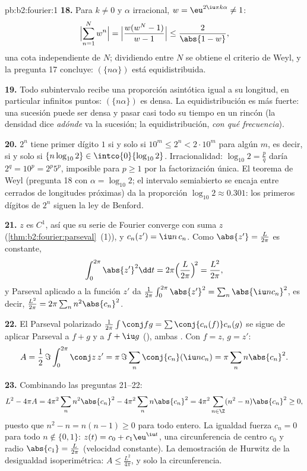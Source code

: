 \begin{solution}{pb:b2:fourier:1}
\textbf{18.} Para $k \neq 0$ y $\alpha$ irracional, $w =
\eu^{2\iu\pi k\alpha} \neq 1$:
\[
\Bigl|\sum_{n=1}^{N}w^n\Bigr|
= \Bigl|\frac{w(w^N - 1)}{w - 1}\Bigr|
\leq \frac{2}{\abs{1 - w}} ,
\]
una cota independiente de $N$; dividiendo entre $N$ se obtiene el
criterio de Weyl, y la pregunta 17 concluye: $(\{n\alpha\})$ está
equidistribuida.

\textbf{19.} Todo subintervalo recibe una proporción asintótica igual
a su longitud, en particular infinitos puntos: $(\{n\alpha\})$ es
densa. La equidistribución es más fuerte: una sucesión puede ser
densa y pasar casi todo su tiempo en un rincón (la densidad dice
\emph{adónde} va la sucesión; la equidistribución, \emph{con qué
frecuencia}).

\textbf{20.} $2^n$ tiene primer dígito $1$ si y solo si $10^m \leq
2^n < 2\cdot10^m$ para algún $m$, es decir, si y solo si
$\{n\log_{10}2\} \in \intco{0}{\log_{10}2}$. Irracionalidad:
$\log_{10}2 = \frac pq$ daría $2^q = 10^p = 2^p5^p$, imposible para
$p \geq 1$ por la factorización única. El teorema de Weyl (pregunta
18 con $\alpha = \log_{10}2$; el intervalo
semiabierto se encaja entre cerrados de longitudes próximas) da la
proporción $\log_{10}2 \approx 0.301$: los primeros dígitos de $2^n$
siguen la ley de Benford.

\textbf{21.} $z$ es $C^1$, así que su serie de Fourier converge
 con suma $z$ (\cref{thm:b2:fourier:parseval}~(1)), y
$c_n(z') = \iu n\,c_n$. Como $\abs{z'} = \frac{L}{2\pi}$ es
constante,
\[
\int_0^{2\pi}\abs{z'}^2\dd t
= 2\pi\Bigl(\frac{L}{2\pi}\Bigr)^{\!2}
= \frac{L^2}{2\pi} ,
\]
y Parseval aplicado a la función  $z'$ da
$\frac{1}{2\pi}\int_0^{2\pi}\abs{z'}^2 = \sum_n\abs{\iu nc_n}^2$, es
decir, $\frac{L^2}{2\pi} = 2\pi\sum_n n^2\abs{c_n}^2$.

\textbf{22.} El Parseval polarizado $\frac{1}{2\pi}\int\conj fg =
\sum\conj{c_n(f)}c_n(g)$ se sigue de aplicar Parseval a $f + g$ y a
$f + \iu g$ (), ambas . Con $f =
z$, $g = z'$:
\[
A = \frac12\,\Im\int_0^{2\pi}\conj z\,z'
= \pi\,\Im\sum_n\conj{c_n}(\iu n c_n)
= \pi\sum_n n\abs{c_n}^2 .
\]

\textbf{23.} Combinando las preguntas 21--22:
\[
L^2 - 4\pi A
= 4\pi^2\sum_n n^2\abs{c_n}^2 -
4\pi^2\sum_n n\abs{c_n}^2
= 4\pi^2\sum_{n\in\Z}(n^2 - n)\abs{c_n}^2 \geq 0 ,
\]
puesto que $n^2 - n = n(n-1) \geq 0$ para todo entero. La igualdad
fuerza $c_n = 0$ para todo $n \notin \{0, 1\}$: $z(t) = c_0 +
c_1\eu^{\iu t}$, una circunferencia de centro $c_0$ y radio
$\abs{c_1} = \frac{L}{2\pi}$ (velocidad constante). La demostración
de Hurwitz de la desigualdad isoperimétrica: $A \leq
\frac{L^2}{4\pi}$, y solo la circunferencia.


\end{solution}
